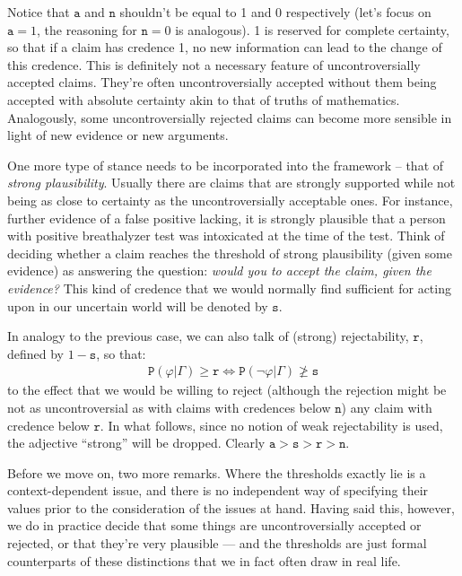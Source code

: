 \documentclass[10pt,leqno]{article}
\newcommand{\n}{\neg}
\begin{document}
Notice that $\mathtt{a}$ and $\mathtt{n}$ shouldn't be equal to 1 and 0 respectively (let's focus on $\mathtt{a}=1$, the reasoning for $\mathtt{n}=0$ is analogous). 1 is reserved for complete certainty, so that  if  a claim has credence 1, no new information can lead to the change of this credence. This is definitely not a necessary feature of uncontroversially accepted claims. They're often uncontroversially accepted without them being accepted with absolute certainty akin to that of truths of mathematics. Analogously, some uncontroversially rejected claims can become more sensible in light of new evidence or new arguments.

One more type of stance needs to be incorporated into the framework -- that of \emph{strong plausibility}. Usually there are claims that are strongly supported while not being as close to certainty as the uncontroversially acceptable ones. For instance, further evidence of a false positive lacking, it is strongly plausible that a person with positive breathalyzer test was intoxicated at the time of the test. Think of deciding whether a claim reaches the threshold of strong plausibility (given some evidence) as answering the question: \emph{would you to accept the claim, given the evidence?}   This  kind of credence that we would normally find sufficient for acting upon in our uncertain world will be denoted by $\mathtt{s}$. 
 
 In analogy to the previous case,  we can also talk of (strong) rejectability, $\mathtt{r}$, defined by $1-\mathtt{s}$, so that:
 \begin{align}
 \tag{Strong} \label{Strong}
 \mathtt{P}(\varphi \vert \Gamma) \geq \mathtt{r} \Leftrightarrow \mathtt{P}(\n \varphi \vert \Gamma) \not \geq \mathtt{s}
 \end{align}
  to the effect that we would be willing to reject (although the rejection might be not as uncontroversial as with claims with credences below $\mathtt{n}$) any claim with credence below $\mathtt{r}$.  In what follows, since no notion of weak rejectability is used, the adjective ``strong'' will be dropped.  Clearly $\mathtt{a}>\mathtt{s}> \mathtt{r}>\mathtt{n}$.

Before we move on, two more remarks. Where the thresholds exactly lie is  a context-dependent issue, and there is no independent way of specifying their values prior to the consideration of the issues at hand. Having said this, however, we do in practice decide that some things are uncontroversially accepted or rejected, or that they're very plausible --- and the thresholds are just formal counterparts of these distinctions that we in fact often draw in real life.
\end{document}
